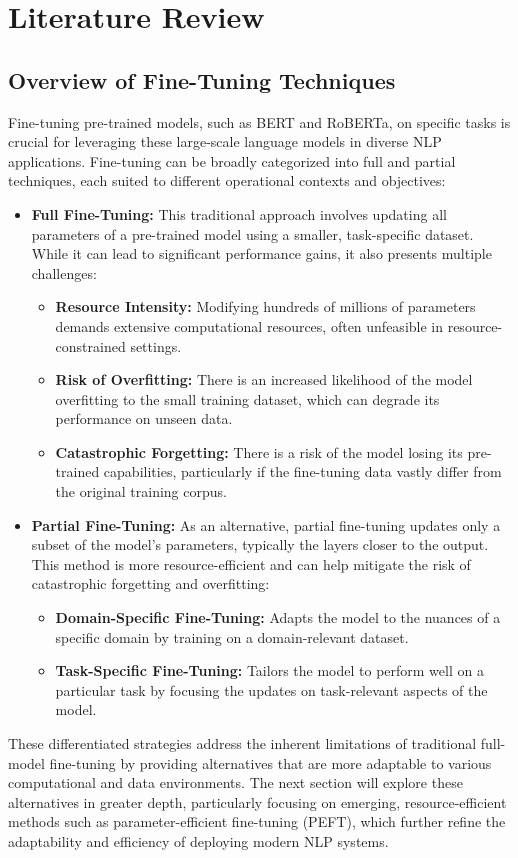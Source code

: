 \documentclass[12pt]{article}
\begin{document}
\section{Literature Review}


\subsection{Overview of Fine-Tuning Techniques}
Fine-tuning pre-trained models, such as BERT and RoBERTa, on specific tasks is crucial for leveraging these large-scale language models in diverse NLP applications. Fine-tuning can be broadly categorized into full and partial techniques, each suited to different operational contexts and objectives:
\begin{itemize}
    \item \textbf{Full Fine-Tuning:} This traditional approach involves updating all parameters of a pre-trained model using a smaller, task-specific dataset. While it can lead to significant performance gains, it also presents multiple challenges:
        \begin{itemize}
            \item \textbf{Resource Intensity:} Modifying hundreds of millions of parameters demands extensive computational resources, often unfeasible in resource-constrained settings.
            \item \textbf{Risk of Overfitting:} There is an increased likelihood of the model overfitting to the small training dataset, which can degrade its performance on unseen data.
            \item \textbf{Catastrophic Forgetting:} There is a risk of the model losing its pre-trained capabilities, particularly if the fine-tuning data vastly differ from the original training corpus.
        \end{itemize}
    \item \textbf{Partial Fine-Tuning:} As an alternative, partial fine-tuning updates only a subset of the model's parameters, typically the layers closer to the output. This method is more resource-efficient and can help mitigate the risk of catastrophic forgetting and overfitting:
        \begin{itemize}
            \item \textbf{Domain-Specific Fine-Tuning:} Adapts the model to the nuances of a specific domain by training on a domain-relevant dataset.
            \item \textbf{Task-Specific Fine-Tuning:} Tailors the model to perform well on a particular task by focusing the updates on task-relevant aspects of the model.
        \end{itemize}
\end{itemize}
These differentiated strategies address the inherent limitations of traditional full-model fine-tuning by providing alternatives that are more adaptable to various computational and data environments. The next section will explore these alternatives in greater depth, particularly focusing on emerging, resource-efficient methods such as parameter-efficient fine-tuning (PEFT), which further refine the adaptability and efficiency of deploying modern NLP systems.
\end{document}
